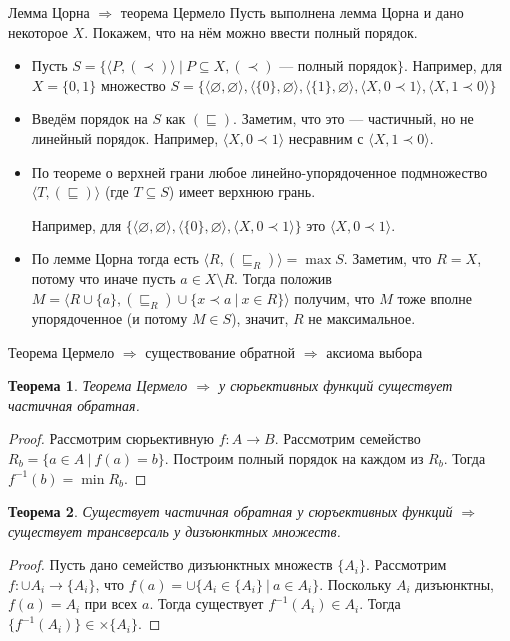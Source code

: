 \documentclass[aspectratio=169]{beamer}
\newtheorem{thm}{Теорема}[section]
\begin{document}
\begin{frame}{Лемма Цорна $\Rightarrow$ теорема Цермело}
Пусть выполнена лемма Цорна и дано некоторое $X$. Покажем, что на нём можно ввести полный порядок.
\begin{itemize}
\item Пусть $S = \{ \langle P, (\prec)\rangle \ |\ P \subseteq X, (\prec)\text{ --- полный порядок} \}$.
{\color{gray}Например, для $X = \{0,1\}$ множество
$S = \{
\langle\varnothing,\varnothing\rangle,
\langle \{0\},\varnothing\rangle,
\langle\{1\},\varnothing\rangle,
\langle X, 0 \prec 1\rangle,
\langle X, 1 \prec 0\rangle
\}$}

\item Введём порядок на $S$ как $(\sqsubseteq)$. Заметим, что это --- частичный, но не линейный порядок. 
{\color{gray}Например, $\langle X, 0 \prec 1\rangle$ несравним с $\langle X, 1 \prec 0\rangle$.}

\item По теореме о верхней грани любое линейно-упорядоченное подмножество 
$\langle T, (\sqsubseteq) \rangle$ (где $T \subseteq S$) имеет
верхнюю грань.

{\color{gray}Например, 
для $\{\langle\varnothing,\varnothing\rangle,
\langle \{0\},\varnothing\rangle,
\langle X, 0 \prec 1\rangle\}$ это $\langle X, 0 \prec 1\rangle$.}

\item По лемме Цорна тогда есть $\langle R, (\sqsubseteq_R)\rangle = \max S$. Заметим, что $R = X$, потому что иначе пусть
$a \in X\setminus R$. Тогда положив $M = \langle R\cup\{a\}, (\sqsubseteq_R)\cup\{x\prec a\ |\ x \in R\} \rangle$
получим, что $M$ тоже вполне упорядоченное (и потому $M \in S$), значит, $R$ не максимальное.
\end{itemize}
\end{frame}

\begin{frame}{Теорема Цермело $\Rightarrow$ существование обратной $\Rightarrow$ аксиома выбора}
\begin{thm}Теорема Цермело $\Rightarrow$ у сюрьективных функций существует частичная обратная.\end{thm}
\begin{proof}
Рассмотрим сюрьективную $f: A \rightarrow B$. Рассмотрим семейство $R_b = \{ a \in A\ |\ f(a) = b \}$.
Построим полный порядок на каждом из $R_b$. Тогда $f^{-1}(b) = \min R_b$.
\end{proof}
\begin{thm}Существует частичная обратная у сюръективных функций $\Rightarrow$ существует трансверсаль у дизъюнктных множеств.\end{thm}
\begin{proof}
Пусть дано семейство дизъюнктных множеств $\{ A_i \}$. 
Рассмотрим $f: \cup A_i \rightarrow \{A_i\}$, что
$f(a) = \cup\{ A_i \in \{ A_i \}\ |\ a \in A_i \}$. Поскольку $A_i$ дизъюнктны,
$f(a) = A_i$ при всех $a$. Тогда существует $f^{-1}(A_i) \in A_i$. Тогда $\{ f^{-1}(A_i) \} \in \times \{A_i\}$.
\end{proof}
\end{frame}
\end{document}
